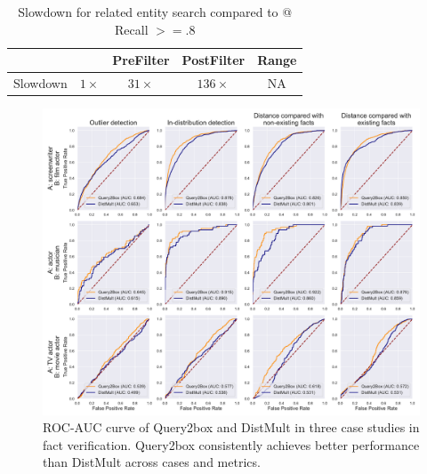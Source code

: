 \begin{table}[t]
\small
\centering
	\caption{Slowdown for related entity search compared to \hybridindex @ Recall $>= .8$}\label{tab:end_to_end}
	\begin{tabular}{| c | c | c | c | c |}
		\hline
		 & \hybridindex & PreFilter & PostFilter & Range \\
		\hline
		\hline
		Slowdown & $1\times$ & $31\times$ & $136\times$ & NA \\
        \hline
	\end{tabular}
\end{table}
\fi
\iffalse


\begin{figure}
        \centering
      \includegraphics[width=1.5\columnwidth]{submissions/Ali2023/figures/final_roc.pdf}
      \caption{ROC-AUC curve of Query2box and DistMult in three case studies in fact verification. Query2box consistently achieves better performance than DistMult across cases and metrics. }
    \label{fig:roc-verification}
\end{figure}


